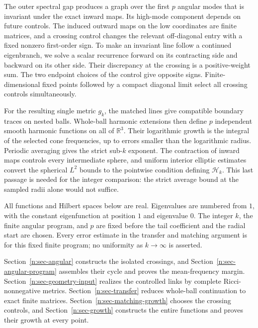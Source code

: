 The outer spectral gap produces a graph over the first $p$ angular modes
that is invariant under the exact inward maps. Its high-mode component
depends on future controls. The induced outward maps on the low coordinates
are finite matrices, and a crossing control changes the relevant
off-diagonal entry with a fixed nonzero first-order sign. To make an invariant
line follow a continued eigenbranch, we solve a scalar recurrence forward
on its contracting side and backward on its other side. Their discrepancy at
the crossing is a positive-weight sum. The two endpoint choices of the
control give opposite signs. Finite-dimensional fixed points followed by a
compact diagonal limit select all crossing controls simultaneously.

For the resulting single metric $g_k$, the matched lines give compatible
boundary traces on nested balls. Whole-ball harmonic extensions then define
$p$ independent smooth harmonic functions on all of $\mathbb R^3$.
Their logarithmic growth is the integral of the selected cone frequencies,
up to errors smaller than the logarithmic radius. Periodic averaging gives
the strict sub-$k$ exponent. The contraction of inward maps controls every
intermediate sphere, and uniform interior elliptic estimates convert the
spherical $L^2$ bounds to the pointwise condition defining $\mathcal H_k$.
This last passage is needed for the integer comparison: the strict average
bound at the sampled radii alone would not suffice.

All functions and Hilbert spaces below are real. Eigenvalues are numbered
from $1$, with the constant eigenfunction at position $1$ and eigenvalue
$0$. The integer $k$, the finite angular program, and $p$ are fixed before
the tail coefficient and the radial start are chosen. Every error estimate
in the transfer and matching argument is for this fixed finite program;
no uniformity as $k\to\infty$ is asserted.


Section~\ref{n:sec-angular} constructs the isolated crossings, and
Section~\ref{n:sec-angular-program} assembles their cycle and proves the
mean-frequency margin. Section~\ref{n:sec-geometry-input} realizes the
controlled links by complete Ricci-nonnegative metrics.
Section~\ref{n:sec-transfer} reduces whole-ball continuation to exact
finite matrices. Section~\ref{n:sec-matching-growth} chooses the crossing
controls, and Section~\ref{n:sec-growth} constructs the entire functions
and proves their growth at every point.
